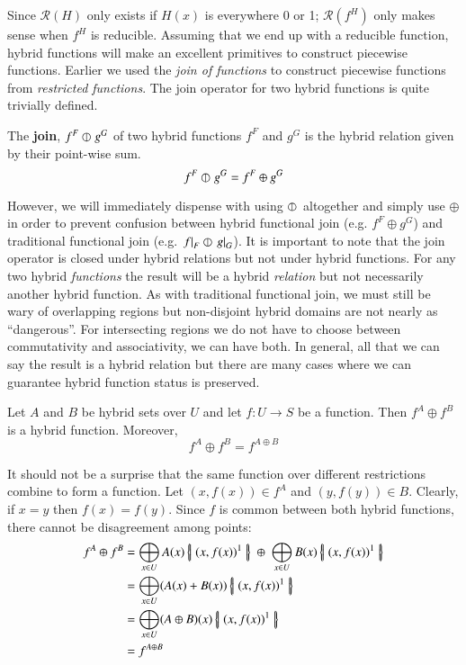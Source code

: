 Since $\mathcal{R}(H)$ only exists if $H(x)$ is everywhere 0 or 1; 
$\mathcal{R}(f^H)$ only makes sense when $f^H$ is reducible.
Assuming that we end up with a reducible function, 
hybrid functions will make an excellent primitives to construct piecewise functions.
Earlier we used the \emph{join of functions} to construct piecewise functions from \emph{restricted functions}.
The join operator for two hybrid functions is quite trivially defined.

 
\begin{definition}
	The \textbf{join}, $f^F \varobar^{} g^G$ of two hybrid functions $f^F$ and $g^G$ is 
	the hybrid relation given by their point-wise sum.
	\begin{equation} \label{def:hjoin}
		f^F \varobar^{} g^G = f^F \oplus g^G
	\end{equation}
\end{definition}


However, we will immediately dispense with using $\varobar^{}$ altogether and simply use $\oplus$ 
in order to prevent confusion between hybrid functional join (e.g. $f^F \oplus g^G$) and 
traditional functional join (e.g. $\left.f\right|_{F} \varobar \left.g\right|_{G}$).
It is important to note that the join operator is closed under hybrid relations but not under hybrid functions.
For any two hybrid \emph{functions} the result will be a hybrid \emph{relation} 
but not necessarily another hybrid function.
As with traditional functional join, we must still be wary of overlapping regions
 but non-disjoint hybrid domains are not nearly as ``dangerous''.
For intersecting regions we do not have to choose between commutativity and associativity, we can have both.
In general, all that we can say the result is a hybrid relation but there are many cases where we can guarantee hybrid function status is preserved.


\begin{theorem}
	\label{thm:compatible1}
	Let $A$ and $B$ be hybrid sets over $U$ and let $f: U \to S$ be a function.
	Then $f^A \oplus f^B$ is a hybrid function.
	Moreover,
	\begin{equation}
		f^A \oplus f^B = f^{A \oplus B}
	\end{equation}
\end{theorem}


It should not be a surprise that the same function over different restrictions combine to form a function.
Let $(x,f(x)) \in f^A$ and $(y,f(y)) \in B$. Clearly, if $x=y$ then $f(x)=f(y)$. 
Since $f$ is common between both hybrid functions, there cannot be disagreement among points:
\begin{align*}
	f^A \oplus f^B 
		&= \bigoplus_{x \in U} A(x) \hset{ (x, f(x) )^1 } 
			\; \oplus \; \bigoplus_{x \in U} B(x) \hset{ (x, f(x) )^1 } \\
		&= \bigoplus_{x \in U} (A(x) + B(x)) \hset{ (x, f(x) )^1 } \\
		&= \bigoplus_{x \in U} (A \oplus B)(x) \hset{ (x, f(x) )^1 } \\ 
		&= f^{A \oplus B}
\end{align*}




